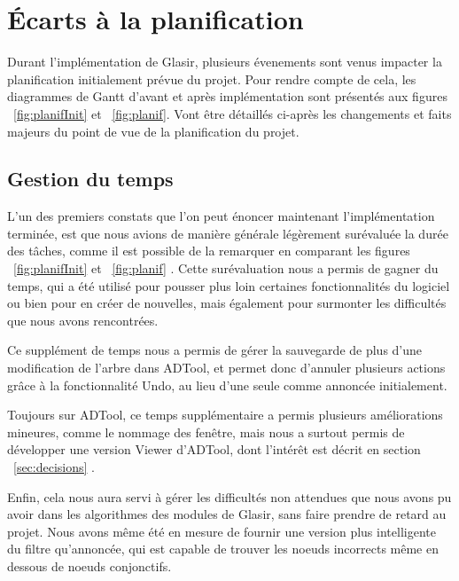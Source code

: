\section{Écarts à la planification}
\label{sec:ecarts}

Durant l'implémentation de Glasir, plusieurs évenements sont venus impacter la planification initialement prévue du projet. Pour rendre compte de cela, les diagrammes de Gantt d'avant et après implémentation sont présentés aux figures 
~\ref{fig:planifInit} et ~\ref{fig:planif}. 
Vont être détaillés ci-après les changements et faits majeurs du point de vue de la planification du projet. 

\subsection{Gestion du temps}

L'un des premiers constats que l'on peut énoncer maintenant l'implémentation terminée, est que nous avions de manière générale légèrement surévaluée la durée des tâches, comme il est possible de la remarquer en comparant les figures ~\ref{fig:planifInit} et  ~\ref{fig:planif}
. Cette surévaluation nous a permis de gagner du temps, qui a été utilisé pour pousser plus loin certaines fonctionnalités du logiciel ou bien pour en créer de nouvelles, mais également pour surmonter les difficultés que nous avons rencontrées.

Ce supplément de temps nous a permis de gérer la sauvegarde de plus d'une modification de l'arbre dans ADTool, et permet donc d'annuler plusieurs actions grâce à la fonctionnalité Undo, au lieu d'une seule comme annoncée initialement.

Toujours sur ADTool, ce temps supplémentaire a permis plusieurs améliorations mineures, comme le nommage des fenêtre, mais nous a surtout permis de développer une version \og Viewer \fg d'ADTool, dont l'intérêt est décrit en section ~\ref{sec:decisions} .

Enfin, cela nous aura servi à gérer les difficultés non attendues que nous avons pu avoir dans les algorithmes des modules de Glasir, sans faire prendre de retard au projet. Nous avons même été en mesure de fournir une version plus intelligente du filtre qu'annoncée, qui est capable de trouver les noeuds incorrects même en dessous de noeuds conjonctifs.  

